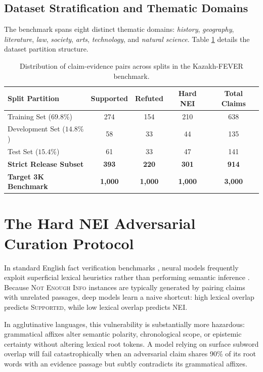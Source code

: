 \subsection{Dataset Stratification and Thematic Domains}
The benchmark spans eight distinct thematic domains: \textit{history}, \textit{geography}, \textit{literature}, \textit{law}, \textit{society}, \textit{arts}, \textit{technology}, and \textit{natural science}. Table \ref{tab:dataset_stats} details the dataset partition structure.

\begin{table}[htbp]
\centering
\caption{Distribution of claim-evidence pairs across splits in the Kazakh-FEVER benchmark.}
\label{tab:dataset_stats}
\begin{tabular}{lcccc}
\toprule
\textbf{Split Partition} & \textbf{Supported} & \textbf{Refuted} & \textbf{Hard NEI} & \textbf{Total Claims} \\
\midrule
Training Set ($69.8\%$)    & 274 & 154 & 210 & 638 \\
Development Set ($14.8\%$) &  58 &  33 &  44 & 135 \\
Test Set ($15.4\%$)        &  61 &  33 &  47 & 141 \\
\midrule
\textbf{Strict Release Subset} & \textbf{393} & \textbf{220} & \textbf{301} & \textbf{914} \\
\textbf{Target 3K Benchmark}   & \textbf{1,000} & \textbf{1,000} & \textbf{1,000} & \textbf{3,000} \\
\bottomrule
\end{tabular}
\end{table}

\section{The Hard NEI Adversarial Curation Protocol}
\label{sec:hard_nei_protocol}

In standard English fact verification benchmarks \citep{thorne2018fever}, neural models frequently exploit superficial lexical heuristics rather than performing semantic inference \citep{schuster2019fever}. Because \textsc{Not Enough Info} instances are typically generated by pairing claims with unrelated passages, deep models learn a naive shortcut: high lexical overlap predicts \textsc{Supported}, while low lexical overlap predicts \textsc{NEI}.

In agglutinative languages, this vulnerability is substantially more hazardous: grammatical affixes alter semantic polarity, chronological scope, or epistemic certainty without altering lexical root tokens. A model relying on surface subword overlap will fail catastrophically when an adversarial claim shares 90\% of its root words with an evidence passage but subtly contradicts its grammatical affixes.


